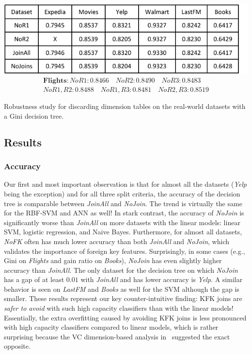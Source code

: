 \documentclass{vldb}
\begin{document}
\begin{table}[t]
\centering
\includegraphics[width=\columnwidth,height=\textheight,keepaspectratio]{table4.pdf}
\begin{align*}
\textbf{Flights} : NoR1: 0.8466 \quad NoR2: 0.8490 \quad NoR3: 0.8483 \\
No R1,R2: 0.8488 \quad No R1,R3: 0.8481 \quad No R2,R3: 0.8519
\end{align*}
\caption{Robustness study for discarding dimension tables on the real-world datasets with a Gini decision tree.}
\label{Table:robustness}
\end{table}

\subsection{Results}

\subsubsection*{Accuracy}
Our first and most important observation is that for almost all the datasets (\textit{Yelp} being the exception) and for all three split criteria, the accuracy of the decision tree 
is comparable between \textit{JoinAll} and \textit{NoJoin}. The trend is virtually the same for the RBF-SVM and ANN as well! In stark contrast, 
the accuracy of \textit{NoJoin} is significantly worse than \textit{JoinAll} on more datasets with the linear models: linear SVM, logistic regression, and Naive Bayes.
Furthermore, for almost all datasets, \textit{NoFK} often has much lower accuracy than both \textit{JoinAll} and \textit{NoJoin}, which validates the importance 
of foreign key features.
Surprisingly, in some cases (e.g., Gini on \textit{Flights} and gain ratio on \textit{Books}), \textit{NoJoin} has even slightly higher accuracy than \textit{JoinAll}.
The only dataset for the decision tree on which \textit{NoJoin} has a gap of at least $0.01$ with \textit{JoinAll} and has lower accuracy is \textit{Yelp}. 
A similar behavior is seen on \textit{LastFM} and \textit{Books} as well for the SVM although the gap is smaller.
These results represent our key counter-intuitive finding: KFK joins are \textit{safer to avoid} with such high capacity classifiers than with the linear models!
Essentially, the extra overfitting caused by avoiding KFK joins is less pronounced with high capacity classifiers compared to linear models, which is rather surprising
because the VC dimension-based analysis in~\cite{hamlet} suggested the exact opposite.
\end{document}
